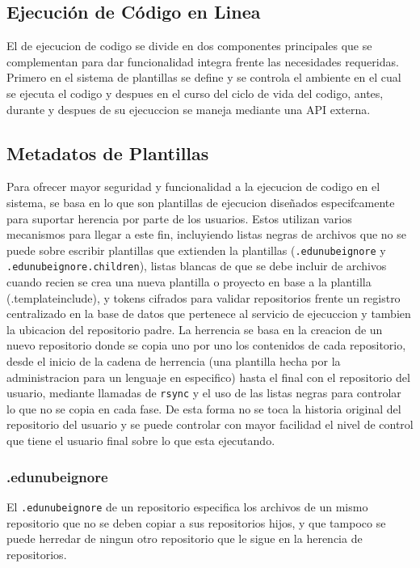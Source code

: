 \subsection{Ejecución de Código en Linea}
El de ejecucion de codigo se divide en dos componentes principales que se complementan para dar funcionalidad integra frente las necesidades requeridas. Primero en el sistema de plantillas se define y se controla el ambiente en el cual se ejecuta el codigo y despues en el curso del ciclo de vida del codigo, antes, durante y despues de su ejecuccion se maneja mediante una API externa.

\subsection{Metadatos de Plantillas}
Para ofrecer mayor seguridad y funcionalidad a la ejecucion de codigo en el sistema, se basa en lo que son plantillas de ejecucion diseñados especifcamente para suportar herencia por parte de los usuarios. Estos utilizan varios mecanismos para llegar a este fin, incluyiendo listas negras de archivos que no se puede sobre escribir plantillas que extienden la plantillas (\texttt{.edunubeignore} y\\ \texttt{.edunubeignore.children}), listas blancas de que se debe incluir de archivos cuando recien se crea una nueva plantilla o proyecto en base a la plantilla (.templateinclude), y tokens cifrados para validar repositorios frente un registro centralizado en la base de datos que pertenece al servicio de ejecuccion y tambien la ubicacion del repositorio padre. La herrencia se basa en la creacion de un nuevo repositorio donde se copia uno por uno los contenidos de cada repositorio, desde el inicio de la cadena de herrencia (una plantilla hecha por la administracion para un lenguaje en especifico) hasta el final con el repositorio del usuario, mediante llamadas de \texttt{rsync} y el uso de las listas negras para controlar lo que no se copia en cada fase. De esta forma no se toca la historia original del repositorio del usuario y se puede controlar con mayor facilidad el nivel de control que tiene el usuario final sobre lo que esta ejecutando. 
\subsubsection{.edunubeignore}
El \texttt{.edunubeignore} de un repositorio especifica los archivos de un mismo repositorio que no se deben copiar a sus repositorios hijos, y que tampoco se puede herredar de ningun otro repositorio que le sigue en la herencia de repositorios.
